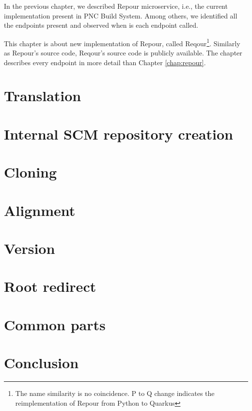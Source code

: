\documentclass[../../main.tex]{subfiles}
\begin{document}
In the previous chapter, we described Repour microservice, i.e., the current implementation present in PNC Build System. Among others, we identified all the endpoints present and observed when is each endpoint called.

This chapter is about new implementation of Repour, called Reqour\footnote{The name similarity is no coincidence. P to Q change indicates the reimplementation of Repour from Python to Quarkus}. Similarly as Repour's source code, Reqour's source code is publicly available\cite{reqour}. The chapter describes every endpoint in more detail than Chapter \ref{chap:repour}.

\section{Translation}


\section{Internal SCM repository creation}


\section{Cloning}


\section{Alignment}


\section{Version}
\label{section:alignment}


\section{Root redirect}


\section{Common parts}


\section{Conclusion}

\end{document}
